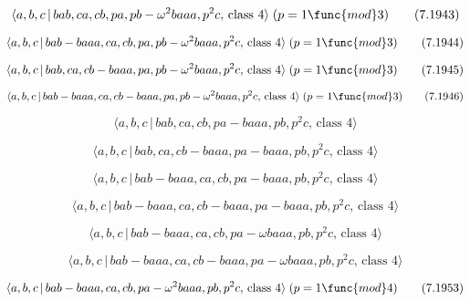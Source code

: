 \documentclass[10pt]{article}
\begin{document}
\begin{equation}
\langle a,b,c\,|\,bab,ca,cb,pa,pb-\omega ^{2}baaa,p^{2}c,\,\text{class }%
4\rangle \;(p=1\func{mod}3)  \tag{7.1943}
\end{equation}

\begin{equation}
\langle a,b,c\,|\,bab-baaa,ca,cb,pa,pb-\omega ^{2}baaa,p^{2}c,\,\text{class }%
4\rangle \;(p=1\func{mod}3)  \tag{7.1944}
\end{equation}

\begin{equation}
\langle a,b,c\,|\,bab,ca,cb-baaa,pa,pb-\omega ^{2}baaa,p^{2}c,\,\text{class }%
4\rangle \;(p=1\func{mod}3)  \tag{7.1945}
\end{equation}

\begin{equation}
\langle a,b,c\,|\,bab-baaa,ca,cb-baaa,pa,pb-\omega ^{2}baaa,p^{2}c,\,\text{%
class }4\rangle \;(p=1\func{mod}3)  \tag{7.1946}
\end{equation}

\begin{equation}
\langle a,b,c\,|\,bab,ca,cb,pa-baaa,pb,p^2c,\,\text{class }4\rangle 
\tag{7.1947}
\end{equation}

\begin{equation}
\langle a,b,c\,|\,bab,ca,cb-baaa,pa-baaa,pb,p^2c,\,\text{class }4\rangle 
\tag{7.1948}
\end{equation}

\begin{equation}
\langle a,b,c\,|\,bab-baaa,ca,cb,pa-baaa,pb,p^2c,\,\text{class }4\rangle 
\tag{7.1949}
\end{equation}

\begin{equation}
\langle a,b,c\,|\,bab-baaa,ca,cb-baaa,pa-baaa,pb,p^2c,\,\text{class }4\rangle
\tag{7.1950}
\end{equation}

\begin{equation}
\langle a,b,c\,|\,bab-baaa,ca,cb,pa-\omega baaa,pb,p^{2}c,\,\text{class }%
4\rangle  \tag{7.1951}
\end{equation}

\begin{equation}
\langle a,b,c\,|\,bab-baaa,ca,cb-baaa,pa-\omega baaa,pb,p^{2}c,\,\text{class 
}4\rangle  \tag{7.1952}
\end{equation}

\begin{equation}
\langle a,b,c\,|\,bab-baaa,ca,cb,pa-\omega ^{2}baaa,pb,p^{2}c,\,\text{class }%
4\rangle \;(p=1\func{mod}4)  \tag{7.1953}
\end{equation}
\end{document}
